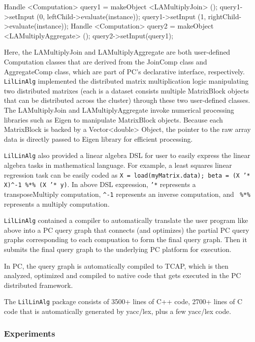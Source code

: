 \begin{code}
Handle <Computation> query1 = makeObject <LAMultiplyJoin> ();
query1->setInput (0, leftChild->evaluate(instance));
query1->setInput (1, rightChild->evaluate(instance));
Handle <Computation> query2 = makeObject <LAMultiplyAggregate> ();
query2->setInput(query1);
\end{code}

Here, the LAMultiplyJoin and LAMultiplyAggregate are both user-defined Computation classes that are
derived from the JoinComp class and AggregateComp class, which are
part of PC's declarative interface,  respectively. \texttt{LilLinAlg}
implemented the distributed matrix multiplication logic manipulating
two distributed matrixes (each is a dataset consists multiple
MatrixBlock objects that can be distributed across the cluster) through these
two user-defined classes. The LAMultiplyJoin
and LAMultiplyAggregate invoke numerical processing libraries such as
Eigen to manipulate MatrixBlock objects. Because each
MatrixBlock is backed by a Vector<double> Object, the pointer to the
raw array data is directly passed to Eigen library for efficient processing.

\texttt{LilLinAlg} also provided a linear algebra DSL for user to
easily express the linear algebra tasks in mathematical language. For
example, a least squares linear regression task can be easily coded as
\texttt{X = load(myMatrix.data); beta = (X '* X)\^{}-1 \%*\% (X '*
  y)}. 
In above DSL expression, \texttt{'*} represents a transposeMultiply computation,
\texttt{\^{}-1} represents an inverse computation, and \texttt{ \%*\%}
represents a multiply computation. 

\texttt{LilLinAlg} contained a compiler
to automatically translate the user program like above into a PC query graph that
connects (and optimizes) the partial PC query graphs corresponding to
each compuation to form the final query graph. Then it submits the
final query graph to the underlying PC platform for execution. 

In PC, the query
graph is automatically compiled to TCAP, which is then analyzed, optimized and compiled to native
code that gets executed in the PC distributed framework.

The \texttt{LilLinAlg} package consists of 3500+ lines of C++ code,
2700+ lines of C code that is automatically generated by yacc/lex, 
plus a few yacc/lex code.

\subsubsection {Experiments}


